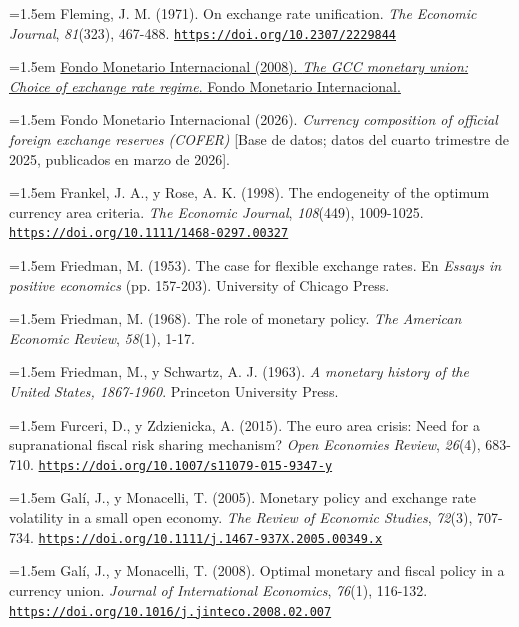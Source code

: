\documentclass[10pt,a4paper]{article}
\begin{document}
\noindent\hangindent=1.5em Fleming, J. M. (1971). On exchange rate unification. \textit{The Economic Journal}, \textit{81}(323), 467-488. \href{https://doi.org/10.2307/2229844}{\nolinkurl{https://doi.org/10.2307/2229844}}

\noindent\hangindent=1.5em \href{https://www.imf.org/external/np/pp/eng/2008/082808a.pdf}{Fondo Monetario Internacional (2008). \textit{The GCC monetary union: Choice of exchange rate regime}. Fondo Monetario Internacional.}

\noindent\hangindent=1.5em Fondo Monetario Internacional (2026). \textit{Currency composition of official foreign exchange reserves (COFER)} [Base de datos; datos del cuarto trimestre de 2025, publicados en marzo de 2026].

\noindent\hangindent=1.5em Frankel, J. A., y Rose, A. K. (1998). The endogeneity of the optimum currency area criteria. \textit{The Economic Journal}, \textit{108}(449), 1009-1025. \href{https://doi.org/10.1111/1468-0297.00327}{\nolinkurl{https://doi.org/10.1111/1468-0297.00327}}

\noindent\hangindent=1.5em Friedman, M. (1953). The case for flexible exchange rates. En \textit{Essays in positive economics} (pp. 157-203). University of Chicago Press.

\noindent\hangindent=1.5em Friedman, M. (1968). The role of monetary policy. \textit{The American Economic Review}, \textit{58}(1), 1-17.

\noindent\hangindent=1.5em Friedman, M., y Schwartz, A. J. (1963). \textit{A monetary history of the United States, 1867-1960}. Princeton University Press.

\noindent\hangindent=1.5em Furceri, D., y Zdzienicka, A. (2015). The euro area crisis: Need for a supranational fiscal risk sharing mechanism? \textit{Open Economies Review}, \textit{26}(4), 683-710. \href{https://doi.org/10.1007/s11079-015-9347-y}{\nolinkurl{https://doi.org/10.1007/s11079-015-9347-y}}

\noindent\hangindent=1.5em Galí, J., y Monacelli, T. (2005). Monetary policy and exchange rate volatility in a small open economy. \textit{The Review of Economic Studies}, \textit{72}(3), 707-734. \href{https://doi.org/10.1111/j.1467-937X.2005.00349.x}{\nolinkurl{https://doi.org/10.1111/j.1467-937X.2005.00349.x}}

\noindent\hangindent=1.5em Galí, J., y Monacelli, T. (2008). Optimal monetary and fiscal policy in a currency union. \textit{Journal of International Economics}, \textit{76}(1), 116-132. \href{https://doi.org/10.1016/j.jinteco.2008.02.007}{\nolinkurl{https://doi.org/10.1016/j.jinteco.2008.02.007}}
\end{document}
